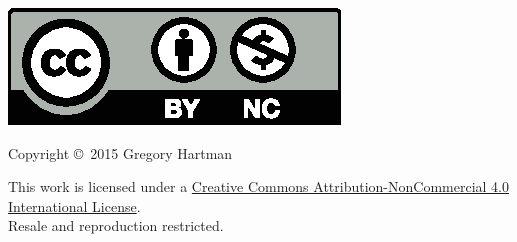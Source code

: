 \noindent\hskip -1in\begin{minipage}{2in}
\href{http://creativecommons.org/licenses/by-nc/4.0/}{\includegraphics{text/by-nc}}
\end{minipage}
\begin{minipage}{3in}
\noindent Copyright \copyright\ 2015 Gregory Hartman

This work is licensed under a \href{http://creativecommons.org/licenses/by-nc/4.0/}{Creative Commons Attribution-NonCommercial 4.0 International License}.\\
Resale and reproduction restricted.
\end{minipage}

